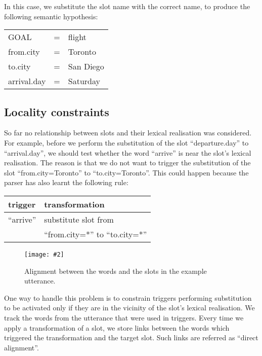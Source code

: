 \documentclass{article}
\newcommand{\fgrparam}[4]{
  \begin{figure}[htbp]
    \begin{center}
      \leavevmode
      \texttt{[image: \#2]}
    \end{center}
    \vspace{-0.5cm}
    \caption{#4}
    \label{#3}
  \end{figure}
}
\begin{document}
In this case, we substitute the slot name with the correct name, to produce the following semantic hypothesis:

\vspace{.15cm}
\begin{tabular}{lll}
  GOAL          & = & flight \\
  from.city     & = & Toronto \\
  to.city       & = & San Diego \\
  arrival.day    & = & Saturday \\
\end{tabular} 

\subsection{Locality constraints} \label{sec:locality:constrain}
So far no relationship between slots and their lexical realisation was considered. For example, before we perform the substitution of the slot ``departure.day'' to ``arrival.day'', we should test whether the word ``arrive'' is near the slot's lexical realisation. The reason is that we do not want to trigger the substitution of the slot ``from.city=Toronto'' to ``to.city=Toronto''. This could happen  because the parser has also learnt the following rule:

\vspace{.15cm}
\begin{tabular}{ll}
  trigger & transformation \\
  \hline 
  ``arrive''            & substitute slot from\\
                        & ``from.city=*'' to ``to.city=*'' \\
\end{tabular} 
\vspace{.15cm}
\fgrparam{width=8cm}{./fig/words-slots-alignment.pdf}{fig:alignment}{Alignment between the words and the slots in the example utterance.}


One way to handle this problem is to constrain triggers performing substitution to be activated only if they are in the vicinity of the slot's lexical realisation. We track the words from the utterance that were used in triggers. Every time we apply a transformation of a slot, we store links between the words which triggered the transformation and the target slot. Such links are referred as ``direct alignment''. 
\end{document}
